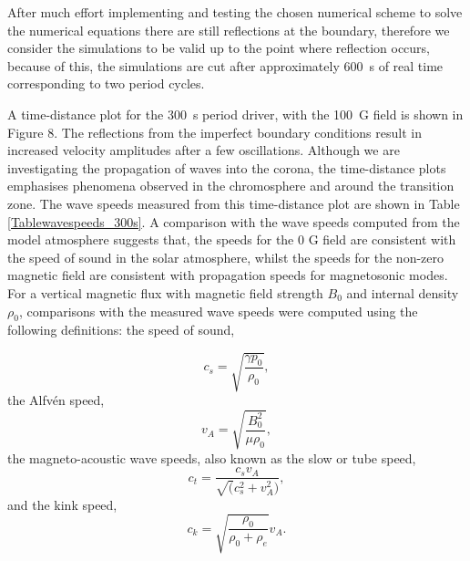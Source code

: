 \documentclass[physics,article,submit,pdftex,moreauthors]{Definitions/mdpi}
\begin{document}
After much  effort implementing and testing  the chosen numerical scheme to solve the numerical equations there are still reflections at the boundary, therefore we consider the simulations to be valid up to the point where reflection occurs, because of this, the simulations are cut after approximately 600~s of real time corresponding to two period cycles.

A  time-distance plot for the 300~s period driver, with the 100~G field is shown in Figure 8. The reflections from the imperfect boundary conditions result in increased velocity amplitudes after a few oscillations. Although we are investigating the propagation of waves into the corona, the time-distance plots emphasises phenomena observed in the chromosphere and around the transition zone.  The wave speeds measured from this time-distance plot are shown in Table \ref{Tablewavespeeds_300s}. A comparison with the wave speeds computed from the model atmosphere suggests that, the speeds for the 0 G field are consistent with the speed of sound in the solar atmosphere, whilst the speeds for the non-zero magnetic field are consistent with propagation speeds for magnetosonic modes.
For a  vertical magnetic flux %
with magnetic field strength $B_{0}$ and internal density $\rho_{0}$, comparisons with the measured wave speeds were computed using the following definitions:
the speed of sound,

\begin{equation}
 c_{s}  =    \sqrt{\frac{\gamma p_0}{\rho_0}}, 
\label{e10}
\end{equation}
the Alfvén speed,
\begin{equation}
 v_{A}  =    \sqrt{\frac{B_{0}^{2}}{\mu\rho_{0}}},  
\label{e11}
\end{equation}
the magneto-acoustic wave speeds, also known as  the slow or tube speed,
\begin{equation}
 c_{t}  =    \frac{c_s v_A}{\sqrt(c_s^2+v_A^2)}, 
\label{e12}
\end{equation}
and the kink speed,
\begin{equation}
 c_{k}  =    \sqrt{\frac{\rho_0}{\rho_0+\rho_e}}v_A.
\label{e12}
\end{equation}
\end{document}
